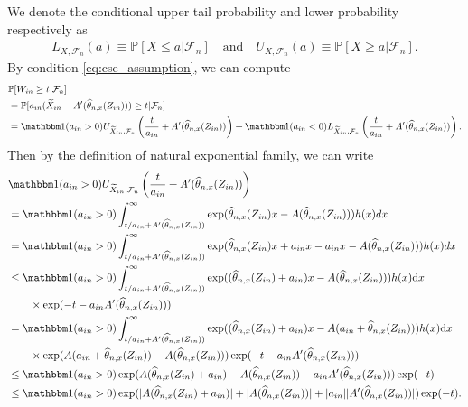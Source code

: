 \documentclass[12pt]{article}
\theoremstyle{definition}
\def\P{\mathbb{P}}
\def\P{\mathbb{P}}
\renewcommand{\P}{\mathbb{P}}							%
\newcommand{\indicator}{\mathbbm 1}						%
\newcommand{\srz}{Z}									%
\newcommand{\srxk}{\widetilde X}						%
\begin{document}
We denote the conditional upper tail probability and lower probability respectively as 
\begin{align*}
  L_{X,\mathcal{F}_n}(a)\equiv \P\left[X\leq a|\mathcal{F}_n\right]\quad\text{and}\quad U_{X,\mathcal{F}_n}(a)\equiv \P\left[X\geq a|\mathcal{F}_n\right].
\end{align*}
By condition \eqref{eq:cse_assumption}, we can compute 
\small
\begin{align*}
  &
  \P[W_{in}\geq t|\mathcal{F}_n]\\
  &
  =\P[a_{in}(\srxk_{in}-A'(\widehat \theta_{n,x}(\srz_{in})))\geq t|\mathcal{F}_n]\\
  &
  =\indicator(a_{in}>0)U_{\srxk_{in},\mathcal{F}_n}\left(\frac{t}{a_{in}}+A'(\widehat{\theta}_{n,x}(\srz_{in}))\right)+\indicator(a_{in}<0)L_{\srxk_{in},\mathcal{F}_n}\left(\frac{t}{a_{in}}+A'(\widehat{\theta}_{n,x}(\srz_{in}))\right).
\end{align*}
\normalsize
Then by the definition of natural exponential family, we can write 
\begin{align*}
  &
  \indicator(a_{in}>0)U_{\srxk_{in},\mathcal{F}_n}\left(\frac{t}{a_{in}}+A'(\widehat{\theta}_{n,x}(\srz_{in}))\right)\\
  &
  =\indicator(a_{in}>0)\int_{t/a_{in}+A'(\widehat{\theta}_{n,x}(\srz_{in}))}^{\infty}\exp(\widehat{\theta}_{n,x}(\srz_{in})x-A(\widehat{\theta}_{n,x}(\srz_{in})))h(x)dx\\
  &
  =\indicator(a_{in}>0)\int_{t/a_{in}+A'(\widehat{\theta}_{n,x}(\srz_{in}))}^{\infty}\exp(\widehat{\theta}_{n,x}(\srz_{in})x+a_{in}x -a_{in}x-A(\widehat{\theta}_{n,x}(\srz_{in})))h(x)dx\\
  &
  \leq \indicator(a_{in}>0)\int_{t/a_{in}+A'(\widehat{\theta}_{n,x}(\srz_{in}))}^{\infty}\exp((\widehat{\theta}_{n,x}(\srz_{in})+a_{in})x-A(\widehat{\theta}_{n,x}(\srz_{in})))h(x)\mathrm{d}x\\
  &
  \qquad\times \exp(-t-a_{in}A'(\widehat{\theta}_{n,x}(\srz_{in})))\\
  &
  =\indicator(a_{in}>0)\int_{t/a_{in}+A'(\widehat{\theta}_{n,x}(\srz_{in}))}^{\infty}\exp((\widehat{\theta}_{n,x}(\srz_{in})+a_{in})x-A(a_{in}+\widehat{\theta}_{n,x}(\srz_{in})))h(x)\mathrm{d}x\\
  &
  \qquad\times \exp(A(a_{in}+\widehat{\theta}_{n,x}(\srz_{in}))-A(\widehat{\theta}_{n,x}(\srz_{in})))\exp(-t-a_{in}A'(\widehat{\theta}_{n,x}(\srz_{in})))\\
  &
  \leq \indicator(a_{in}>0)\exp(A(\widehat{\theta}_{n,x}(\srz_{in})+a_{in})-A(\widehat{\theta}_{n,x}(\srz_{in}))-a_{in}A'(\widehat{\theta}_{n,x}(\srz_{in})))\exp(-t)\\
  &
  \leq \indicator(a_{in}>0)\exp(|A(\widehat{\theta}_{n,x}(\srz_{in})+a_{in})|+|A(\widehat{\theta}_{n,x}(\srz_{in}))|+|a_{in}||A'(\widehat{\theta}_{n,x}(\srz_{in}))|)\exp(-t).
\end{align*}
\end{document}
